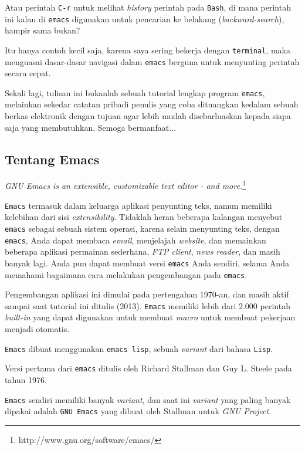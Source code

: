 \documentclass{article}
\begin{document}
Atau perintah \verb=C-r= untuk melihat \emph{history} perintah
pada \verb=Bash=, di mana perintah ini kalau di \verb=emacs=
digunakan untuk pencarian ke belakang (\emph{backward-search}),
hampir sama bukan?

Itu hanya contoh kecil saja, karena saya sering bekerja dengan
\verb=terminal=, maka menguasai dasar-dasar navigasi dalam
\verb=emacs= berguna untuk menyunting perintah secara cepat.

Sekali lagi, tulisan ini bukanlah sebuah tutorial lengkap 
program \verb=emacs=, melainkan sekedar catatan pribadi penulis
yang coba dituangkan kedalam sebuah berkas elektronik dengan 
tujuan agar lebih mudah disebarluaskan kepada siapa saja yang
membutuhkan. Semoga bermanfaat...

\subsection{Tentang Emacs}

\emph{GNU Emacs is an extensible, customizable text editor - and more.}\footnote{http://www.gnu.org/software/emacs/}

\verb=Emacs= termasuk dalam keluarga aplikasi penyunting teks,
namun memiliki kelebihan dari sisi \emph{extensibility}. Tidaklah
heran beberapa kalangan menyebut \verb=emacs= sebagai sebuah sistem
operasi, karena selain menyunting teks, dengan \verb=emacs=, Anda dapat
membaca \emph{email}, menjelajah \emph{website}, dan memainkan 
beberapa aplikasi permainan sederhana, \emph{FTP client}, \emph{news reader},
dan masih banyak lagi. Anda pun dapat membuat versi \verb=emacs= Anda sendiri,
selama Anda memahami bagaimana cara melakukan pengembangan pada \verb=emacs=.

Pengembangan aplikasi ini dimulai pada pertengahan 1970-an, dan 
masih aktif sampai saat tutorial ini ditulis (2013). \verb=Emacs=
memiliki lebih dari 2.000 perintah \emph{built-in} yang dapat
digunakan untuk membuat \emph{macro} untuk membuat pekerjaan
menjadi otomatis.

\verb=Emacs= dibuat menggunakan \verb=emacs lisp=, sebuah
\emph{variant} dari bahasa \verb=Lisp=.

Versi pertama dari \verb=emacs= ditulis oleh Richard Stallman dan
Guy L. Steele pada tahun 1976.

\verb=Emacs= sendiri memiliki banyak \emph{variant}, dan saat ini
\emph{variant} yang paling banyak dipakai adalah \verb=GNU Emacs=
yang dibuat oleh Stallman untuk \emph{GNU Project}.
\end{document}
